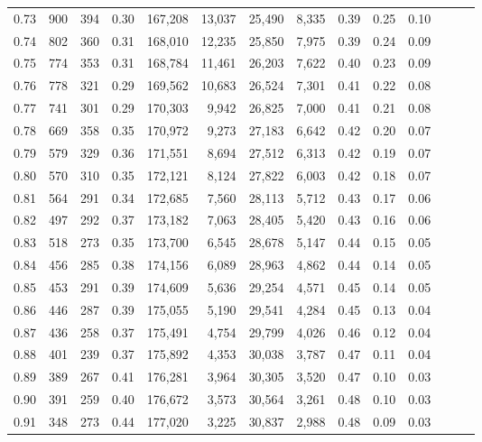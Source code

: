 \begin{tabular}{rrrrrrrrrrrrrr}
0.73 &    900 &    394 &  0.30 &  167,208 &   13,037 &  25,490 &   8,335 &  0.39 &  0.25 &      0.10 \\
0.74 &    802 &    360 &  0.31 &  168,010 &   12,235 &  25,850 &   7,975 &  0.39 &  0.24 &      0.09 \\
0.75 &    774 &    353 &  0.31 &  168,784 &   11,461 &  26,203 &   7,622 &  0.40 &  0.23 &      0.09 \\
0.76 &    778 &    321 &  0.29 &  169,562 &   10,683 &  26,524 &   7,301 &  0.41 &  0.22 &      0.08 \\
0.77 &    741 &    301 &  0.29 &  170,303 &    9,942 &  26,825 &   7,000 &  0.41 &  0.21 &      0.08 \\
0.78 &    669 &    358 &  0.35 &  170,972 &    9,273 &  27,183 &   6,642 &  0.42 &  0.20 &      0.07 \\
0.79 &    579 &    329 &  0.36 &  171,551 &    8,694 &  27,512 &   6,313 &  0.42 &  0.19 &      0.07 \\
0.80 &    570 &    310 &  0.35 &  172,121 &    8,124 &  27,822 &   6,003 &  0.42 &  0.18 &      0.07 \\
0.81 &    564 &    291 &  0.34 &  172,685 &    7,560 &  28,113 &   5,712 &  0.43 &  0.17 &      0.06 \\
0.82 &    497 &    292 &  0.37 &  173,182 &    7,063 &  28,405 &   5,420 &  0.43 &  0.16 &      0.06 \\
0.83 &    518 &    273 &  0.35 &  173,700 &    6,545 &  28,678 &   5,147 &  0.44 &  0.15 &      0.05 \\
0.84 &    456 &    285 &  0.38 &  174,156 &    6,089 &  28,963 &   4,862 &  0.44 &  0.14 &      0.05 \\
0.85 &    453 &    291 &  0.39 &  174,609 &    5,636 &  29,254 &   4,571 &  0.45 &  0.14 &      0.05 \\
0.86 &    446 &    287 &  0.39 &  175,055 &    5,190 &  29,541 &   4,284 &  0.45 &  0.13 &      0.04 \\
0.87 &    436 &    258 &  0.37 &  175,491 &    4,754 &  29,799 &   4,026 &  0.46 &  0.12 &      0.04 \\
0.88 &    401 &    239 &  0.37 &  175,892 &    4,353 &  30,038 &   3,787 &  0.47 &  0.11 &      0.04 \\
0.89 &    389 &    267 &  0.41 &  176,281 &    3,964 &  30,305 &   3,520 &  0.47 &  0.10 &      0.03 \\
0.90 &    391 &    259 &  0.40 &  176,672 &    3,573 &  30,564 &   3,261 &  0.48 &  0.10 &      0.03 \\
0.91 &    348 &    273 &  0.44 &  177,020 &    3,225 &  30,837 &   2,988 &  0.48 &  0.09 &      0.03 \\

\end{tabular}
